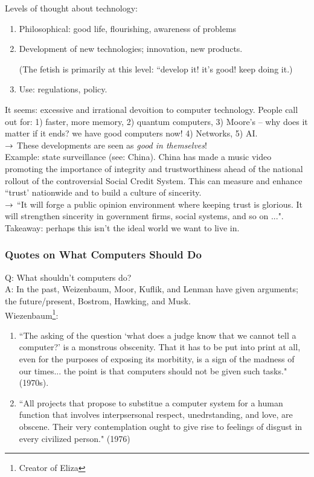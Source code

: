 Levels of thought about technology:
\begin{enumerate}
\item Philosophical: good life, flourishing, awareness of problems
\item Development of new technologies; innovation, new products.

(The fetish is primarily at this level: ``develop it! it's good! keep doing it.)

\item Use: regulations, policy.
\end{enumerate}


It seems: excessive and irrational devoition to computer technology. People call out for: 1) faster, more memory, 2) quantum computers, 3) Moore's -- why does it matter if it ends? we have good computers now! 4) Networks, 5) AI. \\

$\rightarrow$ These developments are seen as {\it good in themselves}! \\

Example: state surveillance (see: China). China has made a music video promoting the importance of integrity and trustworthiness ahead of the national rollout of the controversial Social Credit System. This can measure and enhance ``trust' nationwide and to build a culture of sincerity. \\

$\rightarrow$ ``It will forge a public opinion environment where keeping trust is glorious. It will strengthen sincerity in government firms, social systems, and so on ...". \\

Takeaway: perhaps this isn't the ideal world we want to live in.

\subsubsection{Quotes on What Computers Should Do}

Q: What shouldn't computers do? \\

A: In the past, Weizenbaum, Moor, Kuflik, and Lenman have given arguments; the future/present, Bostrom, Hawking, and Musk. \\

Wiezenbaum\footnote{Creator of Eliza}: 
\begin{enumerate}
\item ``The asking of the question `what does a judge know that we cannot tell a computer?' is a monstrous obscenity. That it has to be put into print at all, even for the purposes of exposing its morbitity, is a sign of the madness of our times... the point is that computers should not be given such tasks." (1970s). \\

\item ``All projects that propose to substitue a computer system for a human function that involves interpsersonal respect, unedrstanding, and love, are obscene. Their very contemplation ought to give rise to feelings of disgust in every civilized person." (1976)
\end{enumerate}

